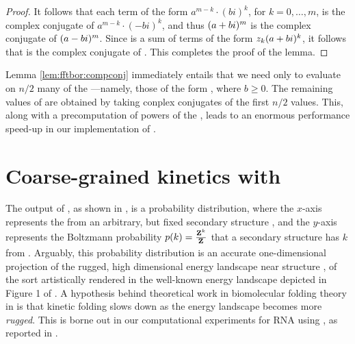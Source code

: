 \documentclass[11pt, oneside]{Thesis} %
\begin{document}
\begin{proof}
It follows that each term of the form
$a^{m-k} \cdot (bi)^k$, for $k=0,\dots,m$, is the complex conjugate of
$a^{m-k} \cdot (-bi)^k$, and thus $(a+bi)^m$ is the complex conjugate of
$(a-bi)^m$. Since \emZof{}{\aPbi} is a sum of terms of the form $z_k (a+bi)^k$,
it follows that \emZof{}{\aMbi} is the complex conjugate of \emZof{}{\aPbi}.
This completes the proof of the lemma.

\end{proof}

Lemma \ref{lem:fftbor:compconj} immediately entails that we need only to evaluate \fullZx on $n/2$
many of the \nRoUs---namely, those of the form
\aPbi, where $b \geq 0$. The remaining values of \fullZx are obtained by
taking conplex conjugates of the first $n/2$ values. This, along with a
precomputation of powers of the \nRoUs, leads to an
enormous performance speed-up in our implementation of \fftbor.

\section{Coarse-grained kinetics with \fftbor}
\label{sec:fftbor:kinetics}

The output of \fftbor, as shown in
, is a probability distribution,
where the $x$-axis represents the \bpd from an arbitrary,
but fixed secondary structure \strSt, and the $y$-axis represents the
Boltzmann probability $p(k) = \frac{{\bf Z}^{k}_{}}{{\bf Z}^{}_{}}$ that a secondary structure
has \bpd $k$ from \strSt. Arguably, this probability distribution
is an accurate one-dimensional projection of the rugged, high dimensional energy
landscape near structure \strSt,
of the sort artistically rendered in the well-known
energy landscape depicted in Figure 1 of \citep{wolynes.ptam05}.
A hypothesis behind theoretical work in biomolecular folding theory in
\citep{bryngelson.p95}
is that kinetic folding slows down as the energy landscape becomes more
{\em rugged}. This is borne out in our computational experiments for RNA
using \fftbor, as reported
in .
\end{document}
